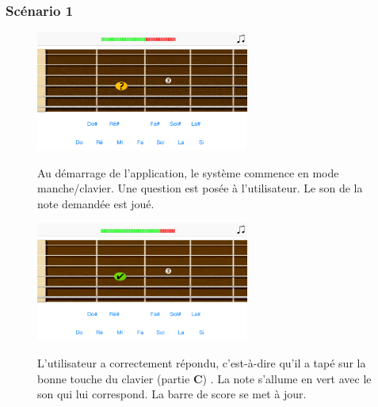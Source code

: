 \documentclass{scrreprt}
\begin{document}
\newpage


\subsubsection{Scénario 1}
\bigbreak

\begin{figure}[!ht]
  \begin{minipage}{0.55\linewidth}
    \includegraphics[width=7cm]{images/maquette_usecase/clavier/question.png}
  \end{minipage}\hfill
  \begin{minipage}{0.5\linewidth}
  {Au démarrage de l'application, le système commence en mode manche/clavier. Une question est posée à l'utilisateur. Le son de la note demandée est joué.}
   \end{minipage}
\end{figure}

\bigbreak

\begin{figure}[!ht]
  \begin{minipage}{0.55\linewidth}
    \includegraphics[width=7cm]{images/maquette_usecase/clavier/bonne.png}
  \end{minipage}\hfill
  \begin{minipage}{0.5\linewidth}
  {L'utilisateur a correctement répondu, c'est-à-dire qu'il a tapé sur la bonne touche du clavier (partie \textbf{C}) . La note s'allume en vert avec le son qui lui correspond. La barre de score se met à jour.}
   \end{minipage}
\end{figure}
\end{document}
